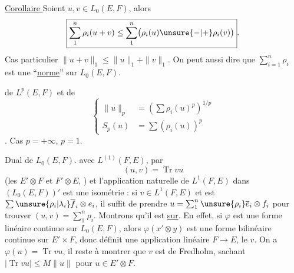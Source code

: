 \uline{Corollaire } Soient $u,v\in L_0(E,F)$, alors
\[
\boxed{\sum_1^n\rho_i(u+v)\leq\sum_1^n\bigl(\rho_i(u)\unsure{-|+}\rho_i(v)\bigr)}.
\]
Cas particulier $\|u+v\|_1\leq\|u\|_1+\|v\|_1$.
On peut aussi dire que $\sum_{i=1}^n\rho_i$ est une ``\uline{norme}'' sur $L_0(E,F)$.


\uline{}

 de $L^p(E,F)$ et de 
\[
\left\{\begin{aligned}
\|u\|_p&=\left(\sum\rho_i(u)^p\right)^{1/p}\\
S_p(u)&=\sum(\rho_i(u))^p
\end{aligned}\right.
\]
  . Cas $p=+\infty$, $p=1$.

Dual de $L_0(E,F)$.   avec $L^{(1)}(F,E)$,  par
\[
\boxed{(u,v)=\operatorname{Tr}vu}
\]
(les $E'\otimes F$ et $F'\otimes E$, )
et l'application naturelle de $L^1(F,E)$ dans $(L_0(E,F))'$ est une isométrie : si $v\in L^1(F,E)$ et est $\sum\unsure{\rho_i|\lambda_i}\overline f_i\otimes e_i$, il suffit de prendre $u=\sum_1^n\unsure{\rho_i}\overline e_i\otimes f_i$ pour trouver $(u,v)=\sum_1^n\rho_i$.
Montrons qu'il est \uline{sur}. En effet, si $\varphi$ est une forme linéaire continue sur $L_0(E,F)$, alors $\varphi(x'\otimes y)$ est une forme bilinéaire continue sur $E'\times F$, donc définit une application linéaire $F\longrightarrow E$,  le $v$. On a $\varphi(u)=\operatorname{Tr}vu$, il reste à montrer que $v$ est de Fredholm, sachant $|\operatorname{Tr}vu|\leq M\|u\|$ pour $u\in E'\otimes F$.


